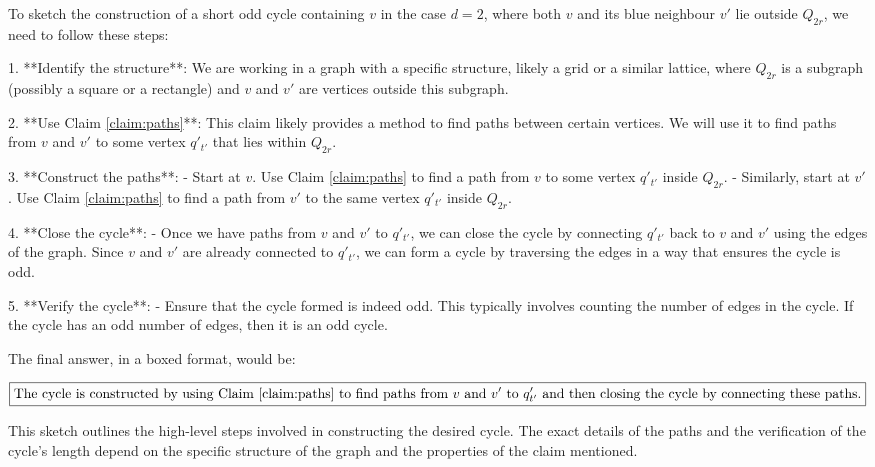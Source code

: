 To sketch the construction of a short odd cycle containing \( v \) in the case \( d = 2 \), where both \( v \) and its blue neighbour \( v' \) lie outside \( Q_{2r} \), we need to follow these steps:

1. **Identify the structure**: We are working in a graph with a specific structure, likely a grid or a similar lattice, where \( Q_{2r} \) is a subgraph (possibly a square or a rectangle) and \( v \) and \( v' \) are vertices outside this subgraph.

2. **Use Claim \ref{claim:paths}**: This claim likely provides a method to find paths between certain vertices. We will use it to find paths from \( v \) and \( v' \) to some vertex \( q'_{t'} \) that lies within \( Q_{2r} \).

3. **Construct the paths**:
   - Start at \( v \). Use Claim \ref{claim:paths} to find a path from \( v \) to some vertex \( q'_{t'} \) inside \( Q_{2r} \).
   - Similarly, start at \( v' \). Use Claim \ref{claim:paths} to find a path from \( v' \) to the same vertex \( q'_{t'} \) inside \( Q_{2r} \).

4. **Close the cycle**:
   - Once we have paths from \( v \) and \( v' \) to \( q'_{t'} \), we can close the cycle by connecting \( q'_{t'} \) back to \( v \) and \( v' \) using the edges of the graph. Since \( v \) and \( v' \) are already connected to \( q'_{t'} \), we can form a cycle by traversing the edges in a way that ensures the cycle is odd.

5. **Verify the cycle**:
   - Ensure that the cycle formed is indeed odd. This typically involves counting the number of edges in the cycle. If the cycle has an odd number of edges, then it is an odd cycle.

The final answer, in a boxed format, would be:

\[
\boxed{\text{The cycle is constructed by using Claim \ref{claim:paths} to find paths from } v \text{ and } v' \text{ to } q'_{t'} \text{ and then closing the cycle by connecting these paths.}}
\]

This sketch outlines the high-level steps involved in constructing the desired cycle. The exact details of the paths and the verification of the cycle's length depend on the specific structure of the graph and the properties of the claim mentioned.